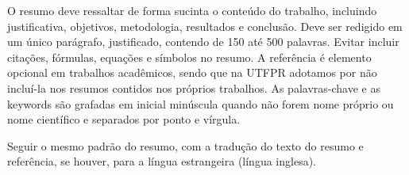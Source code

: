 
\begin{Abstract}[brazilian]%
O resumo deve ressaltar de forma sucinta o conteúdo do trabalho, incluindo justificativa, objetivos, metodologia, resultados e conclusão. Deve ser redigido em um único parágrafo, justificado, contendo de 150 até 500 palavras. Evitar incluir citações, fórmulas, equações e símbolos no resumo. A referência é elemento opcional em trabalhos acadêmicos, sendo que na UTFPR adotamos por não incluí-la nos resumos contidos nos próprios trabalhos. As palavras-chave e as keywords são grafadas em inicial minúscula quando não forem nome próprio ou nome científico e separados por ponto e vírgula.

\end{Abstract}

\begin{Abstract}[english]%
Seguir o mesmo padrão do resumo, com a tradução do texto do resumo e referência, se houver, para a língua estrangeira (língua inglesa).
\end{Abstract}